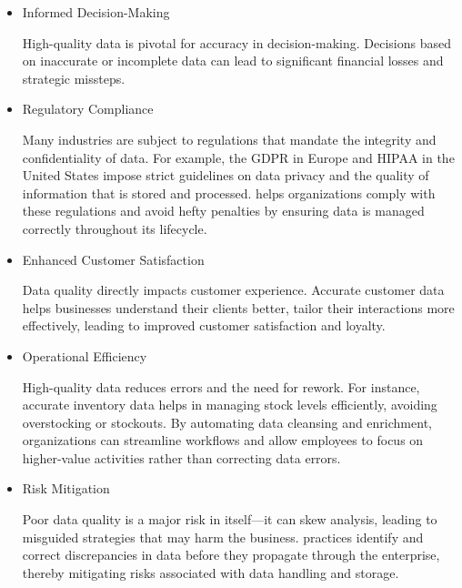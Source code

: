 \begin{itemize}
    \item   Informed Decision-Making
    
    High-quality data is pivotal for accuracy in decision-making. Decisions based on inaccurate or incomplete data can lead to significant financial losses and strategic missteps.

    \item   Regulatory Compliance
    
    Many industries are subject to regulations that mandate the integrity and confidentiality of data. For example, the GDPR in Europe and HIPAA in the United States impose strict guidelines on data privacy and the quality of information that is stored and processed.
         helps organizations comply with these regulations and avoid hefty penalties by ensuring data is managed correctly throughout its lifecycle.

    \item   Enhanced Customer Satisfaction

    Data quality directly impacts customer experience. Accurate customer data helps businesses understand their clients better, tailor their interactions more effectively, leading to improved customer satisfaction and loyalty.

    \item Operational Efficiency
    
    High-quality data reduces errors and the need for rework. For instance, accurate inventory data helps in managing stock levels efficiently, avoiding overstocking or stockouts.
    By automating data cleansing and enrichment, organizations can streamline workflows and allow employees to focus on higher-value activities rather than correcting data errors.    

    \item     Risk Mitigation

    Poor data quality is a major risk in itself—it can skew analysis, leading to misguided strategies that may harm the business.
     practices identify and correct discrepancies in data before they propagate through the enterprise, thereby mitigating risks associated with data handling and storage.

\end{itemize}




